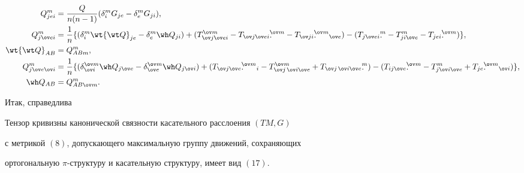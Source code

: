 \begin{align*}


Q^m_{jei}&=\frac{Q}{n(n-1)}(\delta^m_i G_{je}-


\delta^m_e G_{ji}), \\


%


Q^m_{j\ov e i}&=\frac{1}{n}\{(\delta^m_i\wt{\wt Q}_{je}-


\delta^m_e\wh Q_{ji})+(T^{\ov m}_{\ov j\ov e i}-


T_{\ov j\ov e i}{}^{\ov m}_{\dstyle\cdot}-


T_{\ov j i}{}^{\ov m}_{\dstyle\cdot}


{}_{\ov e})-(T_{j\ov e i}{}^m_{\dstyle\cdot}-T^m_{j i\ov e}-


T_{jei}{}^{\ov m}_{\dstyle\cdot})\}, \\


%


\wt{\wt Q}_{AB}&=Q^m_{AB m}, \\


%


Q^m_{j\ov e\ov i}&=\frac{1}{n}\{(\delta^{\ov m}_{\ov i}


\wh Q_{j\ov e}-\delta^{\ov m}_{\ov e}\wh Q_{j\ov i})+


(T_{\ov j\ov e}{}^{\ov m}_{\dstyle\cdot}{}_i-T^{\ov m}_{\ov j\,\ov i\ov e}+


T_{\ov j\,\ov i\ov e}{}^m_{\dstyle\cdot}) -


(T_{ij\ov e}{}^{\ov m}_{\dstyle\cdot}-


T^m_{j\ov i\ov e}+T_{je}{}^{\ov m}_{\dstyle\cdot}{}_{\ov i})\}, \\


%


\wh Q_{AB}&=Q^m_{AB\ov m}.


\end{align*}





Итак, справедлива





\begin{thm}


Тензор кривизны канонической связности касательного расслоения $(TM,G)$


с метрикой $(8)$, допускающего максимальную группу движений, сохраняющих


ортогональную $\pi$-структуру и касательную структуру, имеет вид $(17)$.


\end{thm}





